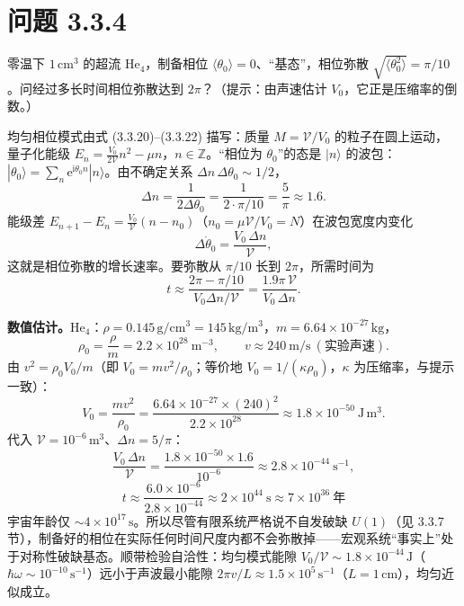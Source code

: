 \section*{问题 3.3.4}
\begin{problem}
零温下 $1\,\mathrm{cm}^{3}$ 的超流 He$_4$，制备相位 $\langle\theta_0\rangle=0$、“基态”，相位弥散 $\sqrt{\langle\theta_0^{2}\rangle}=\pi/10$。问经过多长时间相位弥散达到 $2\pi$？（提示：由声速估计 $V_0$，它正是压缩率的倒数。）
\end{problem}
\solution

均匀相位模式由式 (3.3.20)--(3.3.22) 描写：质量 $M=\mathcal{V}/V_0$ 的粒子在圆上运动，量子化能级 $E_n=\frac{V_0}{2\mathcal{V}}n^{2}-\mu n$，$n\in\mathbb{Z}$。“相位为 $\theta_0$”的态是 $|n\rangle$ 的波包：$|\theta_0\rangle=\sum_n\mathrm{e}^{\mathrm{i}\theta_0 n}|n\rangle$。由不确定关系 $\Delta n\,\Delta\theta_0\sim1/2$，
\begin{equation*}
\Delta n=\frac{1}{2\Delta\theta_0}=\frac{1}{2\cdot\pi/10}=\frac{5}{\pi}\approx1.6 .
\end{equation*}
能级差 $E_{n+1}-E_n=\frac{V_0}{\mathcal{V}}(n-n_0)$（$n_0=\mu\mathcal{V}/V_0=N$）在波包宽度内变化
\begin{equation*}
\Delta\dot\theta_0=\frac{V_0\,\Delta n}{\mathcal{V}} ,
\end{equation*}
这就是相位弥散的增长速率。要弥散从 $\pi/10$ 长到 $2\pi$，所需时间为
\begin{equation*}
t\approx\frac{2\pi-\pi/10}{V_0\Delta n/\mathcal{V}}=\frac{1.9\pi\,\mathcal{V}}{V_0\,\Delta n} .
\end{equation*}

\textbf{数值估计。}He$_4$：$\rho=0.145\,\mathrm{g/cm^{3}}=145\,\mathrm{kg/m^{3}}$，$m=6.64\times10^{-27}\,\mathrm{kg}$，
\begin{equation*}
\rho_0=\frac{\rho}{m}=2.2\times10^{28}\ \mathrm{m^{-3}},\qquad
v\approx240\ \mathrm{m/s}\ (\text{实验声速}) .
\end{equation*}
由 $v^{2}=\rho_0V_0/m$（即 $V_0=m v^{2}/\rho_0$；等价地 $V_0=1/(\kappa\rho_0)$，$\kappa$ 为压缩率，与提示一致）：
\begin{equation*}
V_0=\frac{mv^{2}}{\rho_0}
=\frac{6.64\times10^{-27}\times(240)^{2}}{2.2\times10^{28}}
\approx1.8\times10^{-50}\ \mathrm{J\,m^{3}} .
\end{equation*}
代入 $\mathcal{V}=10^{-6}\,\mathrm{m^{3}}$、$\Delta n=5/\pi$：
\begin{equation*}
\frac{V_0\,\Delta n}{\mathcal{V}}
=\frac{1.8\times10^{-50}\times1.6}{10^{-6}}
\approx2.8\times10^{-44}\ \mathrm{s^{-1}},
\end{equation*}
\begin{equation*}
\boxed{\;t\approx\frac{6.0\times10^{-6}}{2.8\times10^{-44}}\approx2\times10^{44}\ \mathrm{s}
\approx7\times10^{36}\ \text{年}\;}
\end{equation*}
宇宙年龄仅 $\sim4\times10^{17}\,\mathrm{s}$。所以尽管有限系统严格说不自发破缺 $U(1)$（见 3.3.7 节），制备好的相位在实际任何时间尺度内都不会弥散掉——宏观系统“事实上”处于对称性破缺基态。顺带检验自洽性：均匀模式能隙 $V_0/\mathcal{V}\sim1.8\times10^{-44}\,\mathrm{J}$（$\hbar\omega\sim10^{-10}\,\mathrm{s}^{-1}$）远小于声波最小能隙 $2\pi v/L\approx1.5\times10^{5}\,\mathrm{s}^{-1}$（$L=1\,\mathrm{cm}$），均匀近似成立。

